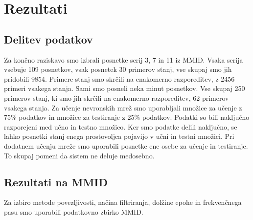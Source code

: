 \chapter{Rezultati}
\section{Delitev podatkov}
Za končno raziskavo smo izbrali posnetke serij 3, 7 in 11 iz MMID. Vsaka serija vsebuje 109 posnetkov, vsak posnetek 30 primerov stanj, vse skupaj smo jih pridobili 9854. Primere stanj smo skrčili na enakomerno razporeditev, z 2456 primeri vsakega stanja. Sami smo posneli neka minut posnetkov. Vse skupaj 250 primerov stanj, ki smo jih skrčili na enakomerno razporeditev, 62 primerov vsakega stanja. Za učenje nevronskih mrež smo uporabljali množice za učenje z 75\% podatkov in množice za testiranje z 25\% podatkov. Podatki so bili naključno razporejeni med učno in testno množico. Ker smo podatke delili naključno, se lahko posnetki stanj enega prostovoljca pojavijo v učni in testni množici. Pri dodatnem učenju mreže smo uporabili posnetke ene osebe za učenje in testiranje. To skupaj pomeni da sistem ne deluje medosebno. 


\section{Rezultati na MMID}
Za izbiro metode povezljivosti, načina filtriranja, dolžine epohe in frekvenčnega pasu smo uporabili podatkovno zbirko MMID. 
